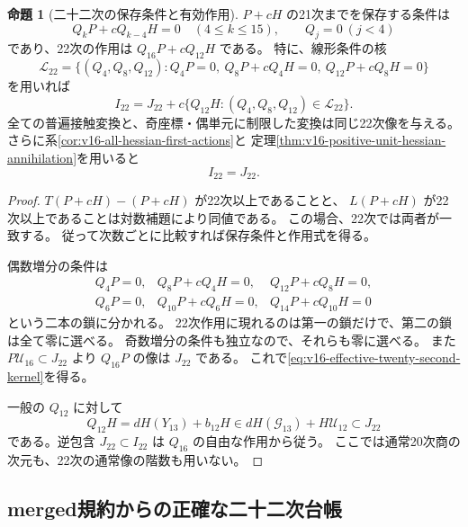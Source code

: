 \documentclass[a4paper,11pt]{ltjsarticle}
\theoremstyle{definition}
\newtheorem{proposition}[theorem]{命題}
\begin{document}
\begin{proposition}[二十二次の保存条件と有効作用]
\label{prop:v16-effective-twenty-second-chain}
$P+cH$ の21次までを保存する条件は
\begin{equation}\label{eq:v16-twenty-second-preservation}
 Q_kP+cQ_{k-4}H=0\quad(4\le k\le15),\qquad Q_j=0\ (j<4)
\end{equation}
であり、22次の作用は $Q_{16}P+cQ_{12}H$ である。
特に、線形条件の核
\[
 \mathcal L_{22}=\{(Q_4,Q_8,Q_{12}):
 Q_4P=0,\ Q_8P+cQ_4H=0,\ Q_{12}P+cQ_8H=0\}
\]
を用いれば
\begin{equation}\label{eq:v16-effective-twenty-second-kernel}
 I_{22}=J_{22}
    +c\{Q_{12}H:(Q_4,Q_8,Q_{12})\in\mathcal L_{22}\}.
\end{equation}
全ての普遍接触変換と、奇座標・偶単元に制限した変換は同じ22次像を与える。
さらに系\ref{cor:v16-all-hessian-first-actions}と
定理\ref{thm:v16-positive-unit-hessian-annihilation}を用いると
\begin{equation}\label{eq:v16-effective-twenty-second-ordinary}
                         I_{22}=J_{22}.
\end{equation}
\end{proposition}

\begin{proof}
$T(P+cH)-(P+cH)$ が22次以上であることと、
$L(P+cH)$ が22次以上であることは対数補題により同値である。
この場合、22次では両者が一致する。
従って次数ごとに比較すれば保存条件と作用式を得る。

偶数増分の条件は
\[
\begin{array}{lll}
Q_4P=0,&Q_8P+cQ_4H=0,&Q_{12}P+cQ_8H=0,\\
Q_6P=0,&Q_{10}P+cQ_6H=0,&Q_{14}P+cQ_{10}H=0
\end{array}
\]
という二本の鎖に分かれる。
22次作用に現れるのは第一の鎖だけで、第二の鎖は全て零に選べる。
奇数増分の条件も独立なので、それらも零に選べる。
また $P\mathcal U_{16}\subset J_{22}$ より $Q_{16}P$ の像は $J_{22}$ である。
これで\eqref{eq:v16-effective-twenty-second-kernel}を得る。

一般の $Q_{12}$ に対して
\[
 Q_{12}H=dH(Y_{13})+b_{12}H
       \in dH(\mathcal G_{13})+H\mathcal U_{12}\subset J_{22}
\]
である。逆包含 $J_{22}\subset I_{22}$ は $Q_{16}$ の自由な作用から従う。
ここでは通常20次商の次元も、22次の通常像の階数も用いない。
\end{proof}

\subsection{merged規約からの正確な二十二次台帳}
\end{document}
